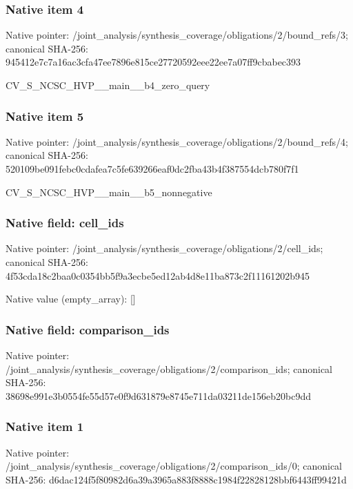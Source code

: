 \documentclass[10pt,a4paper]{article}
\begin{document}
\subsubsection{Native item 4}
Native pointer: /joint\_\allowbreak{}analysis/synthesis\_\allowbreak{}coverage/obligations/2/bound\_\allowbreak{}refs/3; canonical SHA-256: 945412e7c7a16ac3cfa47ee7896e815ce27720592eee22ee7a07ff9cbabec393

\begingroup\raggedright\sloppy CV\_\allowbreak{}S\_\allowbreak{}NCSC\_\allowbreak{}HVP\_\allowbreak{}\_\allowbreak{}main\_\allowbreak{}\_\allowbreak{}b4\_\allowbreak{}zero\_\allowbreak{}query\par\endgroup

\subsubsection{Native item 5}
Native pointer: /joint\_\allowbreak{}analysis/synthesis\_\allowbreak{}coverage/obligations/2/bound\_\allowbreak{}refs/4; canonical SHA-256: 520109be091febc0cdafea7c5fe639266eaf0dc2fba43b4f387554dcb780f7f1

\begingroup\raggedright\sloppy CV\_\allowbreak{}S\_\allowbreak{}NCSC\_\allowbreak{}HVP\_\allowbreak{}\_\allowbreak{}main\_\allowbreak{}\_\allowbreak{}b5\_\allowbreak{}nonnegative\par\endgroup

\subsubsection{Native field: cell\_\allowbreak{}ids}
Native pointer: /joint\_\allowbreak{}analysis/synthesis\_\allowbreak{}coverage/obligations/2/cell\_\allowbreak{}ids; canonical SHA-256: 4f53cda18c2baa0c0354bb5f9a3ecbe5ed12ab4d8e11ba873c2f11161202b945

Native value (empty\_\allowbreak{}array): []

\subsubsection{Native field: comparison\_\allowbreak{}ids}
Native pointer: /joint\_\allowbreak{}analysis/synthesis\_\allowbreak{}coverage/obligations/2/comparison\_\allowbreak{}ids; canonical SHA-256: 38698e991e3b0554fe55d57e0f9d631879e8745e711da03211de156eb20bc9dd

\subsubsection{Native item 1}
Native pointer: /joint\_\allowbreak{}analysis/synthesis\_\allowbreak{}coverage/obligations/2/comparison\_\allowbreak{}ids/0; canonical SHA-256: d6dac124f5f80982d6a39a3965a883f8888c1984f22828128bbf6443ff99421d
\end{document}
